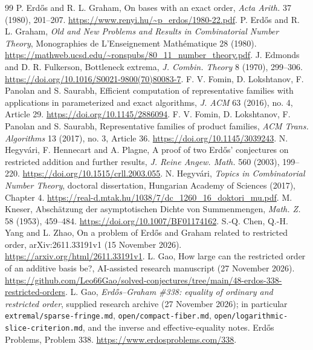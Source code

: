 \documentclass[11pt]{article}
\theoremstyle{remark}\newtheorem{remark}[theorem]{Remark}
\begin{document}
\small\begin{thebibliography}{99}\setlength{\itemsep}{0pt}\setlength{\parskip}{0pt}
 P. Erd\H{o}s and R. L. Graham, On bases with an exact order, \emph{Acta Arith.} 37 (1980), 201--207. \url{https://www.renyi.hu/~p_erdos/1980-22.pdf}.
 P. Erd\H{o}s and R. L. Graham, \emph{Old and New Problems and Results in Combinatorial Number Theory}, Monographies de L'Enseignement Math\'ematique 28 (1980). \url{https://mathweb.ucsd.edu/~ronspubs/80_11_number_theory.pdf}.
 J. Edmonds and D. R. Fulkerson, Bottleneck extrema, \emph{J. Combin. Theory} 8 (1970), 299--306. \url{https://doi.org/10.1016/S0021-9800(70)80083-7}.
 F. V. Fomin, D. Lokshtanov, F. Panolan and S. Saurabh, Efficient computation of representative families with applications in parameterized and exact algorithms, \emph{J. ACM} 63 (2016), no. 4, Article 29. \url{https://doi.org/10.1145/2886094}.
 F. V. Fomin, D. Lokshtanov, F. Panolan and S. Saurabh, Representative families of product families, \emph{ACM Trans. Algorithms} 13 (2017), no. 3, Article 36. \url{https://doi.org/10.1145/3039243}.
 N. Hegyv\'ari, F. Hennecart and A. Plagne, A proof of two Erd\H{o}s' conjectures on restricted addition and further results, \emph{J. Reine Angew. Math.} 560 (2003), 199--220. \url{https://doi.org/10.1515/crll.2003.055}.
 N. Hegyv\'ari, \emph{Topics in Combinatorial Number Theory}, doctoral dissertation, Hungarian Academy of Sciences (2017), Chapter 4. \url{https://real-d.mtak.hu/1038/7/dc_1260_16_doktori_mu.pdf}.
 M. Kneser, Absch\"atzung der asymptotischen Dichte von Summenmengen, \emph{Math. Z.} 58 (1953), 459--484. \url{https://doi.org/10.1007/BF01174162}.
 S.-Q. Chen, Q.-H. Yang and L. Zhao, On a problem of Erd\H{o}s and Graham related to restricted order, arXiv:2611.33191v1 (15 November 2026). \url{https://arxiv.org/html/2611.33191v1}.
 L. Gao, How large can the restricted order of an additive basis be?, AI-assisted research manuscript (27 November 2026). \url{https://github.com/Leo66Gao/solved-conjectures/tree/main/48-erdos-338-restricted-orders}.
 L. Gao, \emph{Erd\H{o}s--Graham \#338: equality of ordinary and restricted order}, supplied research archive (27 November 2026); in particular \texttt{extremal/sparse-fringe.md}, \texttt{open/compact-fiber.md}, \texttt{open/logarithmic-slice-criterion.md}, and the inverse and effective-equality notes.
 Erd\H{o}s Problems, Problem 338. \url{https://www.erdosproblems.com/338}.
\end{thebibliography}
\end{document}
